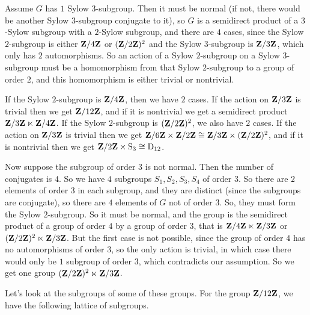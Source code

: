 \documentclass[11pt, oneside]{amsart}
\begin{document}
Assume $G$ has $1$ Sylow $3$-subgroup. Then it must be normal (if not, there would be another Sylow $3$-subgroup conjugate to it), so $G$ is a semidirect product of a $3$-Sylow subgroup with a $2$-Sylow subgroup, and there are $4$ cases, since the Sylow $2$-subgroup is either $\mathbf Z / 4\mathbf Z$ or $(\mathbf Z / 2\mathbf Z)^2$ and the Sylow $3$-subgroup is $\mathbf Z/3\mathbf Z$, which only has $2$ automorphisms. So an action of a Sylow $2$-subgroup on a Sylow $3$-subgroup must be a homomorphism from that Sylow $2$-subgroup to a group of order $2$, and this homomorphism is either trivial or nontrivial.  


If the Sylow $2$-subgroup is $\mathbf Z / 4\mathbf Z$, then we have $2$ cases. If the action on $\mathbf Z/3\mathbf Z$ is trivial then we get $\mathbf Z / 12\mathbf Z$, and if it is nontrivial we get a semidirect product $\mathbf Z/3\mathbf Z \ltimes \mathbf Z/4\mathbf Z$. If the Sylow $2$-subgroup is $(\mathbf Z/2\mathbf Z)^2$, we also have $2$ cases. If the action on $\mathbf Z/3\mathbf Z$ is trivial then we get $\mathbf Z/6\mathbf Z\times\mathbf Z/2\mathbf Z \cong\mathbf Z/3\mathbf Z \times (\mathbf Z/2\mathbf Z)^2$, and if it is nontrivial then we get $\mathbf Z/2\mathbf Z \times \operatorname{S}_3 \cong \operatorname{D}_{12}$.

Now suppose the subgroup of order $3$ is not normal. Then the number of conjugates is $4$. So we have $4$ subgroups $S_1,S_2,S_3,S_4$ of order $3$. So there are $2$ elements of order $3$ in each subgroup, and they are distinct (since the subgroups are conjugate), so there are $4$ elements of $G$ not of order $3$. So, they must form the Sylow $2$-subgroup. So it must be normal, and the group is the semidirect product of a group of order $4$ by a group of order $3$, that is $\mathbf Z / 4\mathbf Z\ltimes \mathbf Z / 3\mathbf Z$ or $(\mathbf Z / 2\mathbf Z)^2 \ltimes \mathbf Z / 3\mathbf Z$. But the first case is not possible, since the group of order $4$ has no automorphisms of order $3$, so the only action is trivial, in which case there would only be $1$ subgroup of order $3$, which contradicts our assumption. So we get one group $(\mathbf Z / 2\mathbf Z)^2 \ltimes \mathbf Z / 3\mathbf Z$.

Let's look at the subgroups of some of these groups. For the group $\mathbf Z / 12\mathbf Z$, we have the following lattice of subgroups.
\begin{center}
\end{center}
\end{document}
